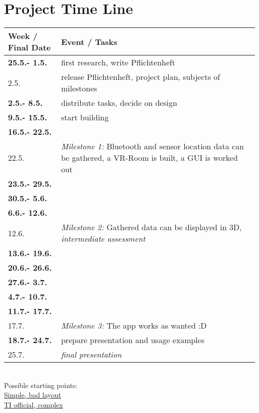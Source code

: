 \section{Project Time Line}


\begin{tabular}{l|p{12cm}}

\textbf{Week / Final Date}  & \textbf{Event / Tasks} \\ \hline

\textbf{25.5.- 1.5.} & first research, write Pflichtenheft \\ 
2.5. & release Pflichtenheft, project plan, subjects of milestones\\ \hline
\textbf{2.5.- 8.5.} & distribute tasks, decide on design\\ 
\textbf{9.5.- 15.5.} & start building \\ 
\textbf{16.5.- 22.5.} & \\
22.5. & \textit{Milestone 1:} Bluetooth and sensor location data can be gathered, a VR-Room is built, a GUI is worked out\\ \hline
\textbf{23.5.- 29.5.} &  \\
\textbf{30.5.- 5.6.} & \\
\textbf{6.6.- 12.6.} & \\
12.6. & \textit{Milestone 2:} Gathered data can be displayed in 3D, \textit{intermediate assessment} \\ \hline
\textbf{13.6.- 19.6.} & \\
\textbf{20.6.- 26.6.} & \\
\textbf{27.6.- 3.7.} & \\
\textbf{4.7.- 10.7.} & \\
\textbf{11.7.- 17.7.} & \\
17.7. & \textit{Milestone 3:} The app works as wanted :D \\ \hline
\textbf{18.7.- 24.7.} & prepare presentation and usage examples\\
25.7. & \textit{final presentation }

\end{tabular} \\



Possible starting points: \\
\href{https://bitbucket.org/StylingAndroid/bluetoothle/src/1fe191cf34f34f9917b1d0d62c617c607fe3df4d/src/main/java/com/stylingandroid/ble/?at=Part2}{Simple, bad layout} \\
\href{https://git.ti.com/sensortag-20-android/sensortag-20-android/trees/master/sensortag20/BleSensorTag/src/main/java/com/example/ti}{TI official, complex}
